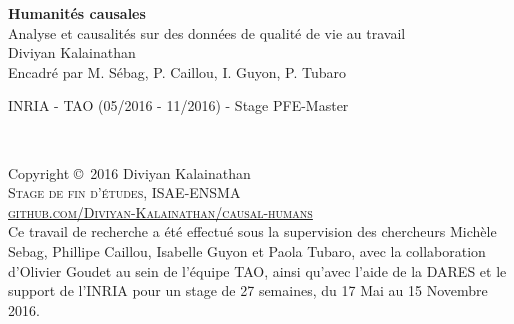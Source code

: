 \documentclass[11pt,fleqn,openany,frenchb]{book} %
\begin{document}

\begingroup
\thispagestyle{empty}
\centering
\vspace*{5cm}
\par\normalfont\fontsize{35}{35}\sffamily\selectfont
\textbf{Humanités causales}\\
{\LARGE Analyse et causalités sur des données de qualité de vie au travail} \\%
\vspace*{0.5cm}
{\Huge Diviyan Kalainathan}\\
{\huge Encadré par M. Sébag, P. Caillou, I. Guyon, P. Tubaro}\par %
{\Large INRIA - TAO (05/2016 - 11/2016) - Stage PFE-Master}\par
\endgroup


\newpage
~\vfill
\thispagestyle{empty}

\noindent Copyright \copyright\ 2016 Diviyan Kalainathan\\ %

\noindent \textsc{Stage de fin d'études, ISAE-ENSMA}\\

\noindent \textsc{\href{https://github.com/Diviyan-Kalainathan/causal-humans}{github.com/Diviyan-Kalainathan/causal-humans}}\\ %


\noindent Ce travail de recherche a été effectué sous la supervision des chercheurs Michèle Sebag, Phillipe Caillou, Isabelle Guyon et Paola Tubaro, avec la collaboration  d'Olivier Goudet au sein de l'équipe TAO, ainsi qu'avec l'aide de la DARES et le support de l'INRIA pour un stage de 27 semaines, du 17 Mai au 15 Novembre 2016. \\ %


\end{document}
